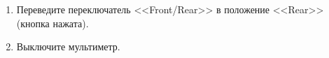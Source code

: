 \begin{enumerate}

\item Переведите переключатель <<Front/Rear>> в положение <<Rear>> (кнопка нажата). 
\item Выключите мультиметр.

\end{enumerate}
